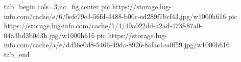  
 
 
 
 


\ifcmt
  tab_begin cols=3,no_fig,center
     pic https://storage.lug-info.com/cache/e/6/5efc79e3-56fd-4488-b00c-ed289f7bcf43.jpg/w1000h616
		 pic https://storage.lug-info.com/cache/1/4/49a022dd-a2ad-473f-87a0-04a3bd3b0d3b.jpg/w1000h616
		 pic https://storage.lug-info.com/cache/a/e/dd56e0d8-5466-49da-8926-8afac1ea0f59.jpg/w1000h616
  tab_end
\fi
